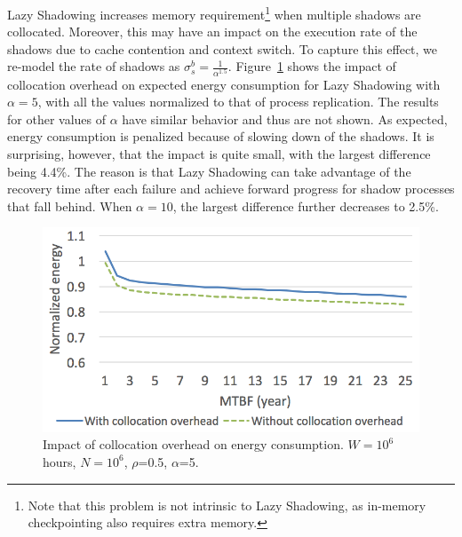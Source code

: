 
Lazy Shadowing increases memory requirement\footnote{Note that this problem is not intrinsic to Lazy Shadowing, as in-memory checkpointing also requires extra memory.} when multiple shadows are collocated. Moreover, this may have an impact on the execution rate of the shadows due to cache contention and context switch. 
To capture this effect,  
we re-model the rate of shadows as $\sigma_s^b=\frac{1}{\alpha^{1.5}}$.
Figure~\ref{fig:comp_vary_fail_speed} shows the impact of collocation overhead on expected energy consumption for Lazy Shadowing with $\alpha=5$, with all the values normalized to that of process replication. The results for other values of $\alpha$ have similar behavior and thus are not shown. As expected, energy consumption is penalized because
of slowing down of the shadows. It is surprising, however, that the impact is quite small, with the largest difference being 4.4\%. The reason is that Lazy Shadowing can take advantage of the recovery time after each failure and achieve forward progress for shadow processes that fall behind. When $\alpha=10$, the largest difference further decreases to 2.5\%. 


\begin{figure}[t]
	\begin{center}
		\includegraphics[width=0.7\columnwidth]{Figures/tcollocation}
	\end{center}
	\caption{Impact of collocation overhead on energy consumption. $W=10^6$ hours, $N=10^6$, $\rho$=0.5, $\alpha$=5.}
	\label{fig:comp_vary_fail_speed}
\end{figure}
